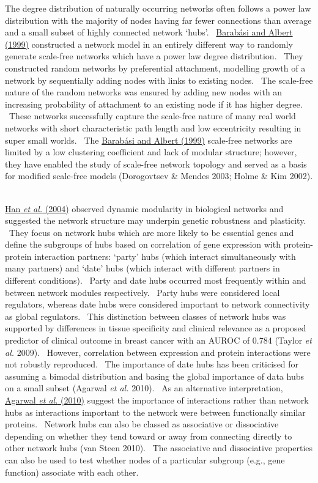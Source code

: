 The degree distribution of naturally occurring networks often follows a power law distribution with the majority of nodes having far fewer connections than average and a small subset of highly connected network {\textquoteleft}hubs{\textquoteright}. \ \hyperlink{ENREF7}{Barab\'asi and Albert (1999)} constructed a network model in an entirely different way to randomly generate scale-free networks which have a power law degree distribution. \ They constructed random networks by preferential attachment, modelling growth of a network by sequentially adding nodes with links to existing nodes. \ The scale-free nature of the random networks was ensured by adding new nodes with an increasing probability of attachment to an existing node if it has higher degree. \ These networks successfully capture the scale-free nature of many real world networks with short characteristic path length and low eccentricity resulting in super small worlds. \ The \hyperlink{ENREF7}{Barab\'asi and Albert (1999)} scale-free networks are limited by a low clustering coefficient and lack of modular structure; however, they have enabled the study of scale-free network topology and served as a basis for modified scale-free models (Dorogovtsev \& Mendes 2003; Holme \& Kim 2002). \ 


\hyperlink{ENREF47}{Han}\hyperlink{ENREF47}{\textit{ et al.}}\hyperlink{ENREF47}{ (2004)} observed dynamic modularity in biological networks and suggested the network structure may underpin genetic robustness and plasticity. \ They focus on network hubs which are more likely to be essential genes and define the subgroups of hubs based on correlation of gene expression with protein-protein interaction partners: {\textquoteleft}party{\textquoteright} hubs (which interact simultaneously with many partners) and {\textquoteleft}date{\textquoteright} hubs (which interact with different partners in different conditions). \ Party and date hubs occurred most frequently within and between network modules respectively. \ Party hubs were considered local regulators, whereas date hubs were considered important to network connectivity as global regulators. \ This distinction between classes of network hubs was supported by differences in tissue specificity and clinical relevance as a proposed predictor of clinical outcome in breast cancer with an AUROC of 0.784 (Taylor\textit{ et al.} 2009). \ However, correlation between expression and protein interactions were not robustly reproduced. \ The importance of date hubs has been criticised for assuming a bimodal distribution and basing the global importance of data hubs on a small subset (Agarwal\textit{ et al.} 2010). \ As an alternative interpretation, \hyperlink{ENREF2}{Agarwal}\hyperlink{ENREF2}{\textit{ et al.}}\hyperlink{ENREF2}{ (2010)} suggest the importance of interactions rather than network hubs as interactions important to the network were between functionally similar proteins. \ Network hubs can also be classed as associative or dissociative depending on whether they tend toward or away from connecting directly to other network hubs (van Steen 2010). \ The associative and dissociative properties can also be used to test whether nodes of a particular subgroup (e.g., gene function) associate with each other. \ 

